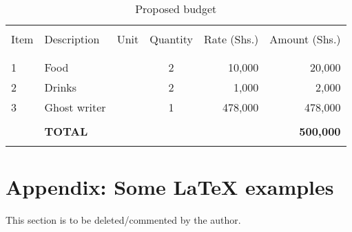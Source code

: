 \begin{table}[!h]
	\begin{center}
		\caption{\label{tbl:Budget}Proposed budget}
		\begin{tabular}{llccrr}
			\hline \\
				Item & Description    & Unit      & Quantity  & Rate (Shs.) & Amount (Shs.)    \\
			\\
			\hline \\				
				1    & Food           &           & 2         & 10,000      & 20,000           \\
				2    & Drinks         &           & 2         & 1,000       & 2,000            \\
				3    & Ghost writer   &           & 1         & 478,000     & 478,000          \\
			\\
				& \textbf{TOTAL} & \textbf{} & \textbf{} & \textbf{}   & \textbf{500,000}		\\
			\hline \\ 
		\end{tabular}
	\end{center}
\end{table}

\clearpage  %
\section*{Appendix: Some \LaTeX{} examples}
This section is to be deleted/commented by the author.
